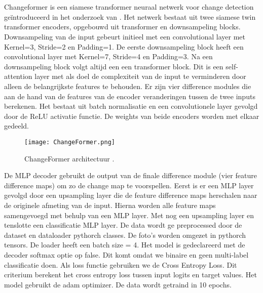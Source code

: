 \section{}%
\label{sec:change-former}
Changeformer is een siamese transformer neuraal netwerk voor change detection geïntroduceerd in het onderzoek van \textcite{Bandara2022}.
Het netwerk bestaat uit twee siamese twin transformer encoders, opgebouwd uit transformer en downsampeling blocks. Downsampeling van de input 
gebeurt initieel met een convolutional layer met Kernel=3, Stride=2 en Padding=1. De eerste downsampeling block heeft een convolutional layer 
met Kernel=7, Stride=4 en Padding=3. Na een downsampeling block volgt altijd een een transformer block. Dit is een 
self-attention layer met als doel de complexiteit van de input te verminderen door alleen de belangrijkste features te behouden. 
Er zijn vier difference modules die aan de hand van de features van de encoder veranderingen tussen de twee inputs berekenen. Het bestaat
uit batch normalisatie en een convolutionele layer gevolgd door de ReLU activatie functie. De weights van beide encoders worden met elkaar gedeeld.
\newline
\newline
\begin{figure*}
  \centering
  \texttt{[image: ChangeFormer.png]}
  \caption{\label{fig:CF}ChangeFormer architectuur \autocite{Bandara2022}.}
\end{figure*}
De MLP decoder gebruikt de output van de finale difference module (vier feature difference maps) om zo de change map te voorspellen.
Eerst is er een MLP layer gevolgd door een upsampling layer die de feature difference maps herschalen naar de originele afmeting van de input. 
Hierna worden alle feature maps samengevoegd met behulp van een MLP layer. Met nog een upsampling layer en tenslotte een classificatie MLP layer. 
\newline
\newline
De data wordt ge preprocessed door de dataset en dataloader pythorch classes. De foto's worden omgezet in pythorch tensors. De loader heeft een
batch size = 4. Het model is gedeclareerd met de decoder softmax optie op false. Dit komt omdat we binaire en geen multi-label classificatie doen.
Als loss functie gebruiken we de Cross Entropy Loss. Dit criterium berekent het cross entropy loss tussen input logits en target values.
Het model gebruikt de adam optimizer. De data wordt getraind in 10 epochs.
\newline
\newline

